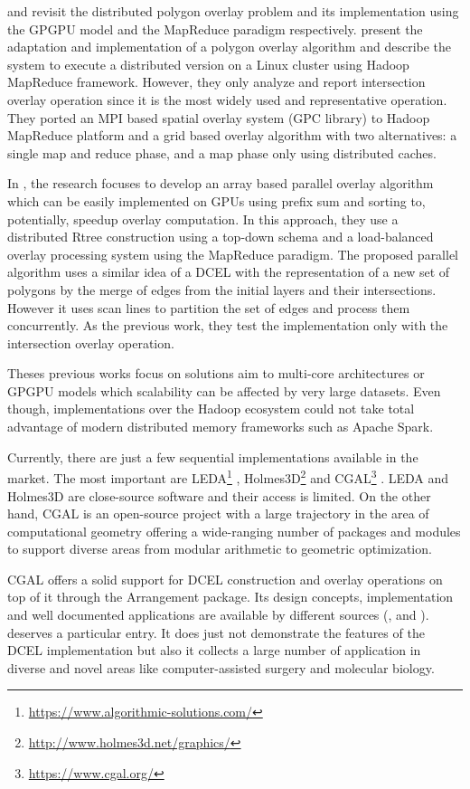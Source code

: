 \cite{puri_efficient_2013} and \cite{puri_mapreduce_2013} revisit the distributed polygon overlay problem and its implementation using the GPGPU model and the MapReduce paradigm respectively.  \cite{puri_mapreduce_2013} present the adaptation and implementation of a polygon overlay algorithm and describe the system to execute a distributed version on a Linux cluster using Hadoop MapReduce framework.  However, they only analyze and report intersection overlay operation since it is the most widely used and representative operation.  They ported an MPI based spatial overlay system (GPC library) to Hadoop MapReduce platform and a grid based overlay algorithm with two alternatives: a single map and reduce phase, and a map phase only using distributed caches.

In \cite{puri_efficient_2013}, the research focuses to develop an array based parallel overlay algorithm which can be easily implemented on GPUs using prefix sum and sorting to,  potentially, speedup overlay computation.  In this approach, they use a distributed Rtree construction using a top-down schema and a load-balanced overlay processing system using the MapReduce paradigm.  The proposed parallel algorithm uses a similar idea of a DCEL with the representation of a new set of polygons by the merge of edges from the initial layers and their intersections.  However it uses scan lines to partition the set of edges and process them concurrently. As the previous work, they test the implementation only with the intersection overlay operation.

Theses previous works focus on solutions aim to multi-core architectures or GPGPU models which scalability can be affected by very large datasets.  Even though, implementations over the Hadoop ecosystem could not take total advantage of modern distributed memory frameworks such as Apache Spark.

Currently, there are just a few sequential implementations available in the market.  The most important are LEDA\footnote{\url{https://www.algorithmic-solutions.com/}} \cite{mehlhorn_leda_1995}, Holmes3D\footnote{\url{http://www.holmes3d.net/graphics/}} \cite{holmes_dcel_2021} and CGAL\footnote{\url{https://www.cgal.org/}} \cite{fogel_cgal_2012}.  LEDA and Holmes3D are close-source software and their access is limited.  On the other hand, CGAL is an open-source project with a large trajectory in the area of computational geometry offering a wide-ranging number of packages and modules to support diverse areas from modular arithmetic to geometric optimization.

CGAL offers a solid support for DCEL construction and overlay operations on top of it through the Arrangement package.  Its design concepts, implementation and well documented applications are available by different sources (\cite{flato_design_2001}, \cite{haran_experimental_2009} and \cite{wein_advanced_2007}).  \cite{fogel_cgal_2012} deserves a particular entry.  It does just not demonstrate the features of the DCEL implementation but also it collects a large number of application in diverse and novel areas like computer-assisted surgery and molecular biology.
